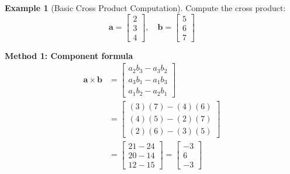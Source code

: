 \documentclass[12pt,a4paper]{article}
\theoremstyle{definition}
\newtheorem{example}{Example}[section]
\begin{document}
\begin{example}[Basic Cross Product Computation]
Compute the cross product:
\begin{equation}
\mathbf{a} = \begin{bmatrix} 2 \\ 3 \\ 4 \end{bmatrix}, \quad
\mathbf{b} = \begin{bmatrix} 5 \\ 6 \\ 7 \end{bmatrix}
\end{equation}

\textbf{Method 1: Component formula}
\begin{align}
\mathbf{a} \times \mathbf{b} &= \begin{bmatrix}
a_2b_3 - a_3b_2 \\
a_3b_1 - a_1b_3 \\
a_1b_2 - a_2b_1
\end{bmatrix} \\
&= \begin{bmatrix}
(3)(7) - (4)(6) \\
(4)(5) - (2)(7) \\
(2)(6) - (3)(5)
\end{bmatrix} \\
&= \begin{bmatrix}
21 - 24 \\
20 - 14 \\
12 - 15
\end{bmatrix} = \begin{bmatrix}
-3 \\
6 \\
-3
\end{bmatrix}
\end{align}


\end{example}
\end{document}
